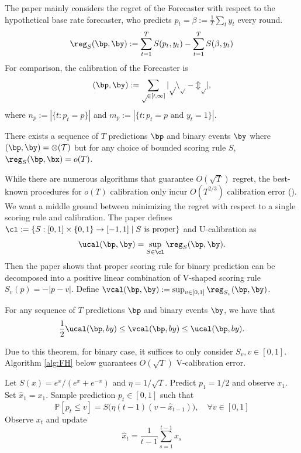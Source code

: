 The paper mainly considers the regret of the Forecaster with respect to the hypothetical base rate forecaster, who predicts $p_t=\beta:=\frac{1}{T}\sum_t y_t$ every round.
\[
\reg_S(\bp, \by) := \sum_{t=1}^T S(p_t, y_t) - \sum_{t=1}^T S(\beta, y_t)
\]
For comparison, the calibration of the Forecaster is 
\[
\cal(\bp,\by) := \sum_{p \in [0,1]} |pn_p - m_p|, 
\]
where $n_p :=|\{t: p_t=p\}|$ and $m_p := |\{t: p_t=p \text{ and } y_t=1\}|$.

\begin{lemma}
    There exists a sequence of $T$ predictions $\bp$ and binary events $\by$ where $\cal(\bp, \by) = \Omega(T)$ but for any choice of bounded scoring rule $S$, $\reg_S(\bp, \bx)=o(T)$.
\end{lemma}
While there are numerous algorithms that guarantee $O(\sqrt{T})$ regret, the best-known procedures for $o(T)$ calibration only incur $O(T^{2/3})$ calibration error (\cite{blum2007calibration}).
We want a middle ground between minimizing the regret with respect to a single scoring rule and calibration. The paper defines $\cl := \{S:[0,1]\times \{0,1\} \to [-1,1] \mid S \text{ is proper}\}$ and U-calibration as
\[
\ucal(\bp, \by) = \sup_{S \in \cl} \reg_S (\bp, \by).
\]
Then the paper shows that proper scoring rule for binary prediction can be decomposed into a positive linear combination of V-shaped scoring rule $S_v(p) = -|p-v|$. Define $\vcal(\bp,\by) := \sup_{v\in[0,1]} \reg_{S_v}(\bp,\by)$. 

\begin{theorem} \label{thm:ucal-vcal}
    For any sequence of $T$ predictions $\bp$ and binary events $\by$, we have that
    \[
    \frac{1}{2}\ucal(\bp,by) \leq \vcal(\bp,by) \leq \ucal(\bp,by).
    \]
\end{theorem}
Due to this theorem, for binary case, it suffices to only consider $S_v, v\in[0,1]$. Algorithm \ref{alg:FH} below guarantees $O(\sqrt{T})$ V-calibration error. 
\begin{algorithm}
\caption{\textsc{ForecastHedge}}\label{alg:FH}
\begin{algorithmic}[1]
\State Let $S(x) = e^x/(e^x + e^{-x})$ and $\eta = 1 / \sqrt{T}$.
\State Predict $p_1 = 1/2$ and observe $x_1$. Set $\hat{x}_1 = x_1$.
    \State Sample prediction $p_t \in [0,1]$ such that
    \[
        \mathbb{P}[p_t \le v] = S\bigl(\eta (t-1)(v - \hat{x}_{t-1})\bigr), \quad \forall v \in [0,1]
    \]
    \State Observe $x_t$ and update
    \[
        \hat{x}_t = \frac{1}{t-1} \sum_{s=1}^{t-1} x_s
    \]
\EndFor
\end{algorithmic}
\end{algorithm}